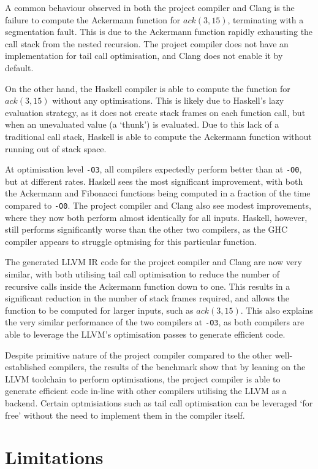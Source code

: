 A common behaviour observed in both the project compiler and Clang is the failure to compute the
Ackermann function for $ack(3,15)$, terminating with a segmentation fault. This is due to the
Ackermann function rapidly exhausting the call stack from the nested recursion. The project compiler
does not have an implementation for tail call optimisation, and Clang does not enable it by default.

On the other hand, the Haskell compiler is able to compute the function for $ack(3,15)$ without any
optimisations. This is likely due to Haskell's lazy evaluation strategy, as it does not create stack
frames on each function call, but when an unevaluated value (a `thunk') is evaluated. Due to this
lack of a traditional call stack, Haskell is able to compute the Ackermann function without running
out of stack space.

At optimisation level \texttt{-O3}, all compilers expectedly perform better than at \texttt{-O0},
but at different rates. Haskell sees the most significant improvement, with both the Ackermann and
Fibonacci functions being computed in a fraction of the time compared to \texttt{-O0}. The project
compiler and Clang also see modest improvements, where they now both perform almost identically for
all inputs. Haskell, however, still performs significantly worse than the other two compilers, as
the GHC compiler appears to struggle optmising for this particular function.

The generated LLVM IR code for the project compiler and Clang are now very similar, with both
utilising tail call optimisation to reduce the number of recursive calls inside the Ackermann
function down to one. This results in a significant reduction in the number of stack frames
required, and allows the function to be computed for larger inputs, such as $ack(3,15)$. This also
explains the very similar performance of the two compilers at \texttt{-O3}, as both compilers are
able to leverage the LLVM's optimisation passes to generate efficient code.

Despite primitive nature of the project compiler compared to the other well-established compilers,
the results of the benchmark show that by leaning on the LLVM toolchain to perform optimisations,
the project compiler is able to generate efficient code in-line with other compilers utilising the
LLVM as a backend. Certain optmisiations such as tail call optimisation can be leveraged `for free'
without the need to implement them in the compiler itself.

\section{Limitations}

